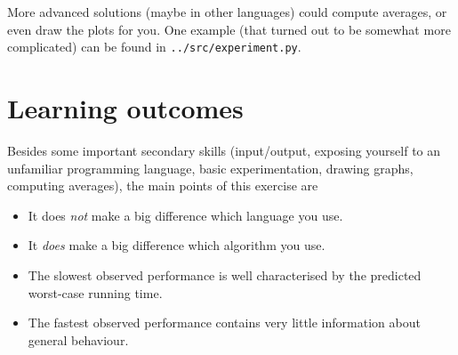 \documentclass{tufte-handout}
\begin{document}
\begin{description}
    More advanced solutions (maybe in other languages) could compute averages, or even draw the plots for you.
    One example (that turned out to be somewhat more complicated) can be found in \texttt{../src/experiment.py}.
\end{description}

\section{Learning outcomes}

Besides some important secondary skills (input/output, exposing yourself to an unfamiliar programming language, basic experimentation, drawing graphs, computing averages), the main points of this exercise are
\begin{itemize}
  \item It does \emph{not} make a big difference which language you use.
  \item It \emph{does} make a big difference which algorithm you use.
  \item The slowest observed performance is well characterised by the predicted worst-case running time.
  \item The fastest observed performance contains very little information about general behaviour.
\end{itemize}
\end{document}
